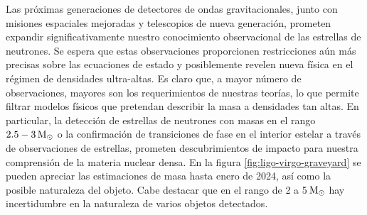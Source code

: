 Las próximas generaciones de detectores de ondas gravitacionales, junto con misiones espaciales mejoradas y telescopios de nueva generación, prometen expandir significativamente nuestro conocimiento observacional de las estrellas de neutrones. Se espera que estas observaciones proporcionen restricciones aún más precisas sobre las ecuaciones de estado y posiblemente revelen nueva física en el régimen de densidades ultra-altas. Es claro que, a mayor número de observaciones, mayores son los requerimientos de nuestras teorías, lo que permite filtrar modelos físicos que pretendan describir la masa a densidades tan altas.
En particular, la detección de estrellas de neutrones con masas en el rango $2.5-3 \,\text{M}_\odot$ o la confirmación de transiciones de fase en el interior estelar a través de observaciones de estrellas, prometen descubrimientos de impacto para nuestra comprensión de la materia nuclear densa. En la figura \ref{fig:ligo-virgo-graveyard} se pueden apreciar las estimaciones de masa hasta enero de 2024, así como la posible naturaleza del objeto. Cabe destacar que en el rango de 2 a 5$\,\text{M}_\odot$ hay incertidumbre en la naturaleza de varios objetos detectados.


